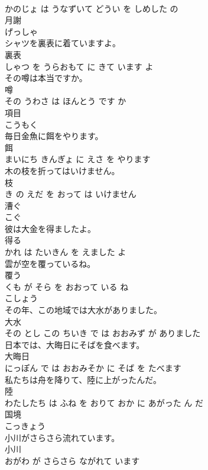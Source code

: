 \documentclass[8pt]{extreport}
\begin{document}
\begin{CJK}{UTF8}{min}
\\	かのじょ は うなずいて どうい を しめした の			
\\	月謝	
\\	げっしゃ		
\\	シャツを裏表に着ていますよ。	
\\	裏表 
\\	しゃつ を うらおもて に きて います よ			
\\	その噂は本当ですか。	
\\	噂 
\\	その うわさ は ほんとう です か			
\\	項目	
\\	こうもく		
\\	毎日金魚に餌をやります。	
\\	餌 
\\	まいにち きんぎょ に えさ を やります			
\\	木の枝を折ってはいけません。	
\\	枝 
\\	き の えだ を おって は いけません			
\\	漕ぐ	
\\	こぐ		
\\	彼は大金を得ましたよ。	
\\	得る 
\\	かれ は たいきん を えました よ			
\\	雲が空を覆っているね。	
\\	覆う 
\\	くも が そら を おおって いる ね			
\\	こしょう	
\\	その年、この地域では大水がありました。	
\\	大水 
\\	その とし この ちいき で は おおみず が ありました			
\\	日本では、大晦日にそばを食べます。	
\\	大晦日 
\\	にっぽん で は おおみそか に そば を たべます			
\\	私たちは舟を降りて、陸に上がったんだ。	
\\	陸 
\\	わたしたち は ふね を おりて おか に あがった ん だ			
\\	国境	
\\	こっきょう		
\\	小川がさらさら流れています。	
\\	小川 
\\	おがわ が さらさら ながれて います			

\end{CJK}
\end{document}
